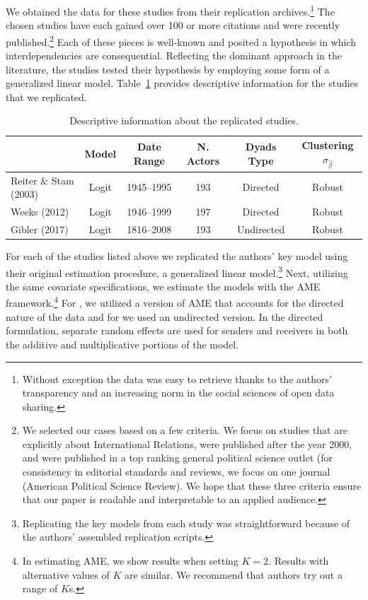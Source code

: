 \documentclass[12pt]{amsart}
\begin{document}
We obtained the data for these studies from their replication archives.\footnote{Without exception the data was easy to retrieve thanks to the authors' transparency and an increasing norm in the social sciences of open data sharing.} The chosen studies have each gained over 100 or more citations and were recently published.\footnote{We selected our cases based on a few criteria. We focus on studies that are explicitly about International Relations, were published after the year 2000, and were published in a top ranking general political science outlet (for consistency in editorial standards and reviews, we focus on one journal (American Political Science Review). We hope that these three criteria ensure that our paper is readable and interpretable to an applied audience.} Each of these pieces is well-known and posited a hypothesis in which interdependencies are consequential. Reflecting the dominant approach in the literature, the studies tested their hypothesis by employing some form of a generalized linear model. Table~\ref{tab:modelDesign} provides descriptive information for the studies that we replicated.

\begin{table}
\caption{Descriptive information about the replicated studies. }
	\begin{tabular}{lccccc}
		& Model &  Date Range & N. Actors  & Dyads Type & Clustering $\sigma_{\hat{\beta}}$ \\ \toprule
		Reiter \& Stam (2003) & Logit &1945--1995 &  193 & Directed & Robust \\
		Weeks (2012) & Logit & 1946--1999 & 197 & Directed & Robust \\
		Gibler (2017) & Logit & 1816--2008 & 193 & Undirected & Robust \\ \bottomrule
	\end{tabular}
	\label{tab:modelDesign}
\end{table}

For each of the studies listed above we replicated the authors' key model using their original estimation procedure, a generalized linear model.\footnote{Replicating the key models from each study was straightforward because of the authors' assembled replication scripts.} Next, utilizing the same covariate specifications, we estimate the models with the AME framework.\footnote{In estimating AME, we show results when setting $K=2$. Results with alternative values of $K$ are similar. We recommend that authors try out a range of $K$s.} For \citet{reiter:stam:2003, weeks:2012}, we utilized a version of AME that accounts for the directed nature of the data and for \citet{gibler:2017} we used an undirected version. In the directed formulation, separate random effects are used for senders and receivers in both the additive and multiplicative portions of the model.
\end{document}
